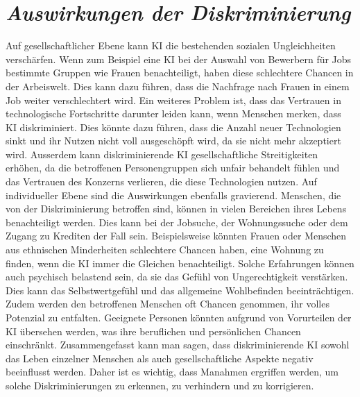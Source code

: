 \documentclass{article}
\begin{document}
\section{\textit{Auswirkungen der Diskriminierung}}
Auf gesellschaftlicher Ebene kann KI die bestehenden sozialen Ungleichheiten verschärfen. Wenn zum Beispiel eine KI bei der Auswahl von Bewerbern für Jobs bestimmte Gruppen wie Frauen benachteiligt, haben diese schlechtere Chancen in der Arbeiswelt. Dies kann dazu führen, dass die Nachfrage nach Frauen in einem Job weiter verschlechtert wird. Ein weiteres Problem ist, dass das Vertrauen in technologische Fortschritte darunter leiden kann, wenn Menschen merken, dass KI diskriminiert. Dies könnte dazu führen, dass die Anzahl neuer Technologien sinkt und ihr Nutzen nicht voll ausgeschöpft wird, da sie nicht mehr akzeptiert wird. Ausserdem kann diskriminierende KI gesellschaftliche Streitigkeiten erhöhen, da die betroffenen Personengruppen sich unfair behandelt fühlen und das Vertrauen des Konzerns verlieren, die diese Technologien nutzen. Auf individueller Ebene sind die Auswirkungen ebenfalls gravierend. Menschen, die von der Diskriminierung betroffen sind, können in vielen Bereichen ihres Lebens benachteiligt werden. Dies kann bei der Jobsuche, der Wohnungssuche oder dem Zugang zu Krediten der Fall sein. Beispielsweise könnten Frauen oder Menschen aus ethnischen Minderheiten schlechtere Chancen haben, eine Wohnung zu finden, wenn die KI immer die Gleichen benachteiligt. Solche Erfahrungen können auch psychisch belastend sein, da sie das Gefühl von Ungerechtigkeit verstärken. Dies kann das Selbstwertgefühl und das allgemeine Wohlbefinden beeinträchtigen. Zudem werden den betroffenen Menschen oft Chancen genommen, ihr volles Potenzial zu entfalten. Geeignete Personen könnten aufgrund von Vorurteilen der KI übersehen werden, was ihre beruflichen und persönlichen Chancen einschränkt. Zusammengefasst kann man sagen, dass diskriminierende KI sowohl das Leben einzelner Menschen als auch gesellschaftliche Aspekte negativ beeinflusst werden. Daher ist es wichtig, dass Manahmen ergriffen werden, um solche Diskriminierungen zu erkennen, zu verhindern und zu korrigieren. 
\end{document}
